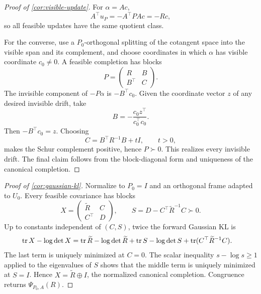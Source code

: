 \begin{proof}[Proof of \cref{cor:visible-update}]
For \(\alpha=Ac\),
\[
  A^\top u_P=-A^\top PA c=-Rc,
\]
so all feasible updates have the same quotient class.

For the converse, use a \(P_0\)-orthogonal splitting of the cotangent space
into the visible span and its complement, and choose coordinates in which
\(\alpha\) has visible coordinate \(c_0\ne0\).  A feasible completion has
blocks
\[
  P=\begin{pmatrix}R&B\\B^\top&C\end{pmatrix}.
\]
The invisible component of \(-P\alpha\) is \(-B^\top c_0\).  Given the
coordinate vector \(z\) of any desired invisible drift, take
\[
  B=-\frac{c_0z^\top}{c_0^\top c_0}.
\]
Then \(-B^\top c_0=z\).  Choosing
\[
  C=B^\top R^{-1}B+tI,
  \qquad t>0,
\]
makes the Schur complement positive, hence \(P\succ0\).  This realizes every
invisible drift.  The final claim follows from the block-diagonal form and
uniqueness of the canonical completion.
\end{proof}

\begin{proof}[Proof of \cref{cor:gaussian-kl}]
Normalize to \(P_0=I\) and an orthogonal frame adapted to \(U_0\).  Every
feasible covariance has blocks
\[
  X=\begin{pmatrix}\widetilde R&C\\C^\top&D\end{pmatrix},
  \qquad
  S=D-C^\top\widetilde R^{-1}C\succ0.
\]
Up to constants independent of \((C,S)\), twice the forward Gaussian KL is
\begin{align*}
  \operatorname{tr} X-\log\det X
  &=\operatorname{tr}\widetilde R-\log\det\widetilde R
  +\operatorname{tr} S-\log\det S
  +\operatorname{tr}(C^\top\widetilde R^{-1}C).
\end{align*}
The last term is uniquely minimized at \(C=0\).  The scalar inequality
\(s-\log s\ge1\) applied to the eigenvalues of \(S\) shows that the middle
term is uniquely minimized at \(S=I\).  Hence
\(X=\widetilde R\oplus I\), the normalized canonical completion.  Congruence
returns \(\Psi_{P_0,A}(R)\).
\end{proof}

